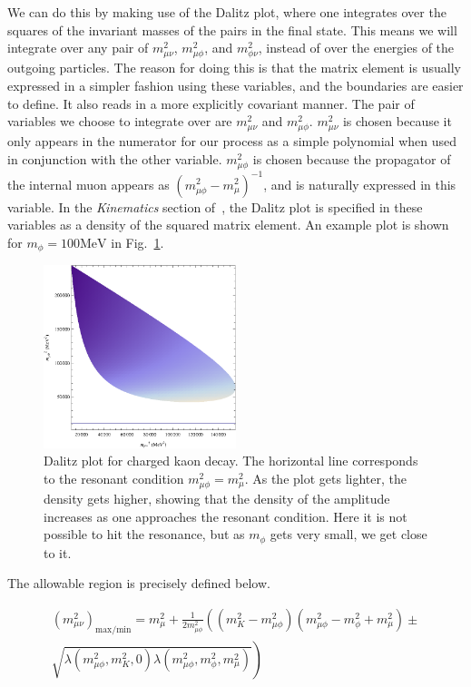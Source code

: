 We can do this by making use of the Dalitz plot, where one integrates over the squares of the invariant masses of the pairs in the final state.
This means we will integrate over any pair of $m_{\mu\nu}^2$, $m_{\mu\phi}^2$, and $m_{\phi\nu}^2$, instead of over the energies of the outgoing particles.
The reason for doing this is that the matrix element is usually expressed in a simpler fashion using these variables, and the boundaries are easier to define.
It also reads in a more explicitly covariant manner.
The pair of variables we choose to integrate over are $m_{\mu\nu}^2$ and $m_{\mu\phi}^2$.
$m_{\mu\nu}^2$ is chosen because it only appears in the numerator for our process as a simple polynomial when used in conjunction with the other variable.
$m_{\mu\phi}^2$ is chosen because the propagator of the internal muon appears as $\left(m_{\mu\phi}^2 - m_\mu^2\right)^{-1}$, and is naturally expressed in this variable.
In the \emph{Kinematics} section of~\cite{Agashe:2014kda}, the Dalitz plot is specified in these variables as a density of the squared matrix element.
An example plot is shown for $m_\phi = 100\textrm{MeV}$ in Fig.~\ref{fig:dalitz_plot}.

\begin{figure}[h]
    \centering
    \includegraphics[width=0.5\textwidth]{Figures/kaon/dalitz}
    \caption{Dalitz plot for charged kaon decay. The horizontal line corresponds to the resonant condition $m_{\mu\phi}^2 = m_\mu^2$. As the plot gets lighter, the density gets higher, showing that the density of the amplitude increases as one approaches the resonant condition. Here it is not possible to hit the resonance, but as $m_\phi$ gets very small, we get close to it.}
    \label{fig:dalitz_plot}
\end{figure}

\noindent The allowable region is precisely defined below.

\begin{equation}
\begin{split}
    (m_{\mu\nu}^2)_\textrm{max/min} = m_\mu^2 + \frac{1}{2 m_{\mu\phi}^2} \left(\left(m_K^2 - m_{\mu\phi}^2\right)\left(m_{\mu\phi}^2 - m_\phi^2 + m_\mu^2\right) \pm \right. \\
    \left. \sqrt{\lambda\left(m_{\mu\phi}^2,m_K^2,0\right) \lambda\left(m_{\mu\phi}^2,m_\phi^2,m_\mu^2\right)}\right)
\end{split}
\end{equation}

